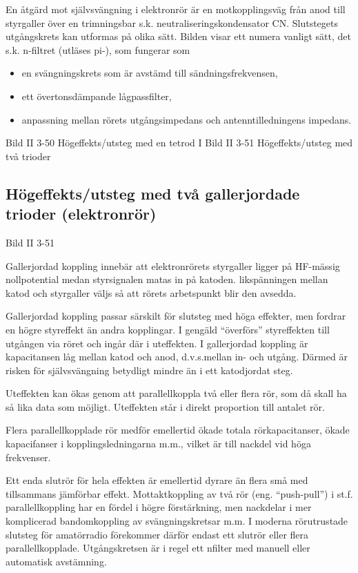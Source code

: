 En åtgärd mot självsvängning i elektronrör är en motkopplingsväg från
anod till styrgaller över en trimningsbar
s.k. neutraliseringskondensator CN. Slutstegets utgångskrets kan
utformas på olika sätt. Bilden visar ett numera vanligt sätt, det
s.k. n-filtret (utläses pi-), som fungerar som
\begin{itemize}
\item en svängningskrets som är avstämd till sändningsfrekvensen,
\item ett övertonsdämpande lågpassfilter,
\item anpassning mellan rörets utgångsimpedans och antenntilledningens impedans.
\end{itemize}

Bild II 3-50 Högeffekts/utsteg med en tetrod
I
Bild II 3-51 Högeffekts/utsteg med två trioder

\subsection{Högeffekts/utsteg med två gallerjordade trioder (elektronrör)}

Bild II 3-51

Gallerjordad koppling innebär att elektronrörets styrgaller ligger på
HF-mässig nollpotential medan styrsignalen matas in på
katoden. likspänningen mellan katod och styrgaller väljs så att rörets
arbetspunkt blir den avsedda.

Gallerjordad koppling passar särskilt för slutsteg med höga effekter,
men fordrar en högre styreffekt än andra kopplingar. I gengäld
``överförs'' styreffekten till utgången via röret och ingår där i
uteffekten. I gallerjordad koppling är kapacitansen låg mellan katod
och anod, d.v.s.mellan in- och utgång. Därmed är risken för
självsvängning betydligt mindre än i ett katodjordat steg.

Uteffekten kan ökas genom att parallellkoppla två eller flera rör, som
då skall ha så lika data som möjligt. Uteffekten står i direkt
proportion till antalet rör.

Flera parallellkopplade rör medför emellertid ökade totala
rörkapacitanser, ökade kapacifanser i kopplingsledningarna m.m.,
vilket är till nackdel vid höga frekvenser.

Ett enda slutrör för hela effekten är emellertid dyrare än flera små
med tillsammans jämförbar effekt. Mottaktkoppling av två rör
(eng. ``push-pull'') i st.f. parallellkoppling har en fördel i högre
förstärkning, men nackdelar i mer komplicerad bandomkoppling av
svängningskretsar m.m. I moderna rörutrustade slutsteg för amatörradio
förekommer därför endast ett slutrör eller flera
parallellkopplade. Utgångskretsen är i regel ett nfilter med manuell
eller automatisk avstämning.

